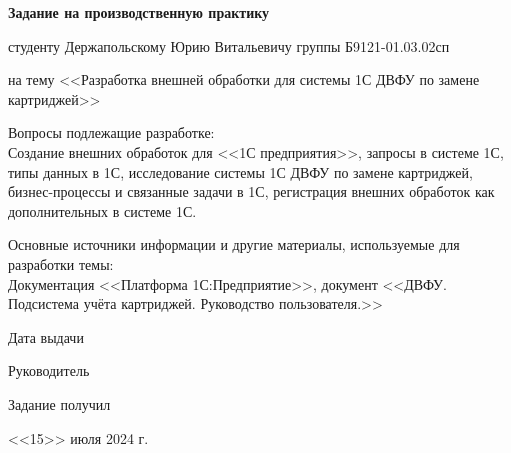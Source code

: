 \begin{center}
    \textbf{Задание на производственную практику}

    студенту Держапольскому Юрию Витальевичу группы Б9121-01.03.02сп
\end{center}
\noindent на тему <<Разработка внешней обработки для системы 1С ДВФУ по замене картриджей>>

\vspace{10pt}

Вопросы подлежащие разработке:\\
Создание внешних обработок для <<1С предприятия>>, запросы в системе 1С, типы данных в 1С, исследование системы 1С ДВФУ по замене картриджей, бизнес-процессы и связанные задачи в 1С, регистрация внешних обработок как дополнительных в системе 1С.

\vspace{10pt}

Основные источники информации и другие материалы, используемые для разработки темы:\\
Документация <<Платформа 1С:Предприятие>>, документ <<ДВФУ. Подсистема учёта картриджей. Руководство пользователя.>>

\begin{multicols}{2}

    Дата выдачи 

    Руководитель

    Задание получил

    \columnbreak

    \hspace*{-1cm} <<15>> июля 2024 г.

    \hspace*{-1cm} 

    \hspace*{-1cm} 

\end{multicols}

\pagebreak

